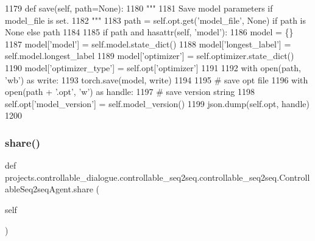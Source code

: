 \begin{DoxyCode}
1179     \textcolor{keyword}{def }save(self, path=None):
1180         \textcolor{stringliteral}{"""}
1181 \textcolor{stringliteral}{        Save model parameters if model\_file is set.}
1182 \textcolor{stringliteral}{        """}
1183         path = self.opt.get(\textcolor{stringliteral}{'model\_file'}, \textcolor{keywordtype}{None}) \textcolor{keywordflow}{if} path \textcolor{keywordflow}{is} \textcolor{keywordtype}{None} \textcolor{keywordflow}{else} path
1184 
1185         \textcolor{keywordflow}{if} path \textcolor{keywordflow}{and} hasattr(self, \textcolor{stringliteral}{'model'}):
1186             model = \{\}
1187             model[\textcolor{stringliteral}{'model'}] = self.model.state\_dict()
1188             model[\textcolor{stringliteral}{'longest\_label'}] = self.model.longest\_label
1189             model[\textcolor{stringliteral}{'optimizer'}] = self.optimizer.state\_dict()
1190             model[\textcolor{stringliteral}{'optimizer\_type'}] = self.opt[\textcolor{stringliteral}{'optimizer'}]
1191 
1192             with open(path, \textcolor{stringliteral}{'wb'}) \textcolor{keyword}{as} write:
1193                 torch.save(model, write)
1194 
1195             \textcolor{comment}{# save opt file}
1196             with open(path + \textcolor{stringliteral}{'.opt'}, \textcolor{stringliteral}{'w'}) \textcolor{keyword}{as} handle:
1197                 \textcolor{comment}{# save version string}
1198                 self.opt[\textcolor{stringliteral}{'model\_version'}] = self.model\_version()
1199                 json.dump(self.opt, handle)
1200 
\end{DoxyCode}
\mbox{\label{classprojects_1_1controllable__dialogue_1_1controllable__seq2seq_1_1controllable__seq2seq_1_1ControllableSeq2seqAgent_ae9da32042638a1a69fe2911ad42d4d08}} 
\subsubsection{\texorpdfstring{share()}{share()}}
{\footnotesize\ttfamily def projects.\+controllable\+\_\+dialogue.\+controllable\+\_\+seq2seq.\+controllable\+\_\+seq2seq.\+Controllable\+Seq2seq\+Agent.\+share (\begin{DoxyParamCaption}\item[{}]{self }\end{DoxyParamCaption})}

